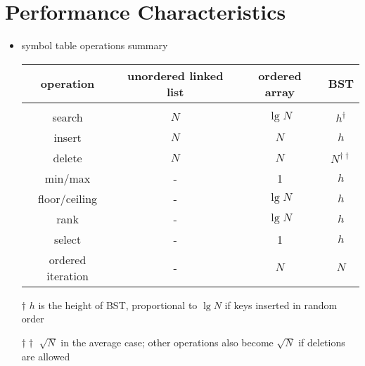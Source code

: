 \documentclass[8pt,a4paper,compress]{beamer}
\begin{document}
\section{Performance Characteristics}
\begin{frame}[fragile]
\begin{itemize}
\item symbol table operations summary
\begin{center}
\begin{tabular}{cccc}
\textbf{operation} & \textbf{unordered linked list} & \textbf{ordered array} & \textbf{BST} \\ \hline \\
search & $N$ & $\lg N$ & $h^\dagger$ \\
insert & $N$ & $N$ & $h$ \\
delete & $N$ & $N$ & $N^{\dagger\dagger}$ \\
min/max & - & 1 & $h$ \\
floor/ceiling & - & $\lg N$ & $h$\\
rank & - & $\lg N$ & $h$ \\
select & - & 1 & $h$ \\
ordered iteration & - & $N$ & $N$ 
\end{tabular} 

\bigskip

\tiny $\dagger$ $h$ is the height of BST, proportional to $\lg N$ if keys inserted in random order

$\dagger\dagger$ $\sqrt{N}$ in the average case; other operations also become $\sqrt{N}$ if deletions are allowed
\end{center}
\end{itemize}
\end{frame}
\end{document}
